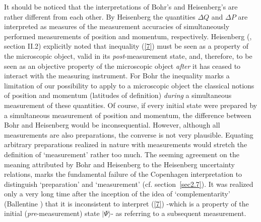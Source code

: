 \documentclass[12pt]{article}
\begin{document}
It should be noticed that the interpretations of Bohr's and
Heisenberg's are rather different from each other. By Heisenberg
the quantities $\Delta Q$ and $\Delta P$ are interpreted as
measures of the measurement accuracies of simultaneously performed
measurements of position and momentum, respectively. Heisenberg
(\cite{Heis30}, section II.2) explicitly noted that inequality
(\ref{7}) must be seen as a property of the microscopic object,
valid in its {\em post}-measurement state, and, therefore, to be
seen as an objective property of the microscopic object {\em
after} it has ceased to interact with the measuring instrument.
For Bohr the inequality marks a limitation of our possibility to
apply to a microscopic object the classical notions of position
and momentum (latitudes of definition) {\em during} a simultaneous
measurement of these quantities. Of course, if every initial state
were prepared by a simultaneous measurement of position and
momentum, the difference between Bohr and Heisenberg would be
inconsequential. However, although all measurements are also
preparations, the converse is not very plausible. Equating
arbitrary preparations realized in nature with measurements would
stretch the definition of `measurement' rather too much. The
seeming agreement on the meaning attributed by Bohr and Heisenberg
to the Heisenberg uncertainty relations, marks the fundamental
failure of the Copenhagen interpretation to distinguish
`preparation' and `measurement' (cf. section~\ref{sec2.7}). It was
realized only a very long time after the inception of the idea of
`complementarity' (Ballentine \cite{Bal70}) that it is
inconsistent to interpret (\ref{7}) -which is a property of the
initial ({\em pre}-measurement) state $|\Psi\rangle$- as referring
to a subsequent measurement.
\end{document}
